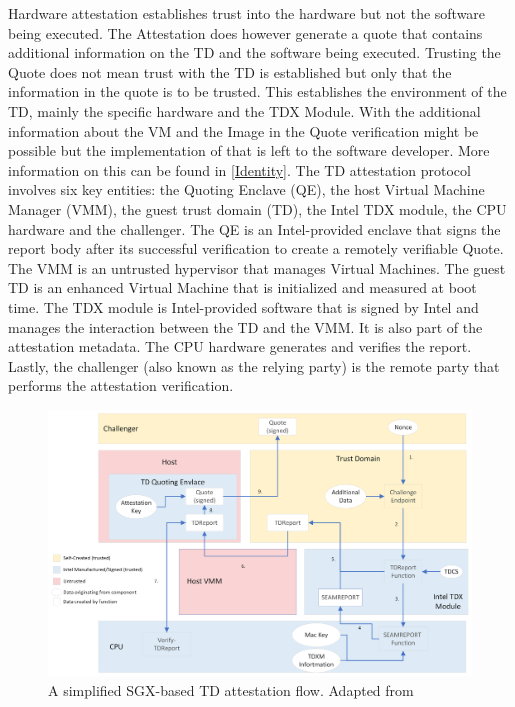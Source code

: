 Hardware attestation establishes trust into the hardware but not the software being executed. The Attestation does however generate a quote that contains additional information on the TD and the software being executed. Trusting the Quote does not mean trust with the TD is established but only that the information in the quote is to be trusted. This establishes the environment of the TD, mainly the specific hardware and the TDX Module. With the additional information about the VM and the Image in the Quote verification might be possible but the implementation of that is left to the software developer. More information on this can be found in \ref{Identity}.
The TD attestation protocol involves six key entities: the Quoting Enclave (QE), the host Virtual Machine Manager (VMM), the guest trust domain (TD), the Intel TDX module, the CPU hardware and the challenger. The QE is an Intel-provided enclave that signs the report body after its successful verification to create a remotely verifiable Quote. The VMM is an untrusted hypervisor that manages Virtual Machines. The guest TD is an enhanced Virtual Machine that is initialized and measured at boot time. The TDX module is Intel-provided software that is signed by Intel and manages the interaction between the TD and the VMM. It is also part of the attestation metadata. The CPU hardware generates and verifies the report. Lastly, the challenger (also known as the relying party) is the remote party that performs the attestation verification.
\begin{figure}
\centering
\includegraphics[width=\textwidth]{figures/Attestation-einfach.png}
\caption{A simplified SGX-based TD attestation flow. Adapted from \cite[p.~111]{noauthor_tdx-module-10-public-specpdf_nodate}}
\label{fig:EasyAttestation}
\end{figure}
